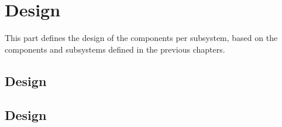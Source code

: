 \part{\LibName{} Design}
\label{sec:Design}

This part defines the design of the components per subsystem, based on the components and subsystems defined in the previous chapters.




\chapter{\SUBSTechBase{} Design}
\label{sec:SUBSUtilitydes}






\chapter{\SUBSLowLevel{} Design}
\label{sec:SUBSLowLeveldes}


%
%

%
%
